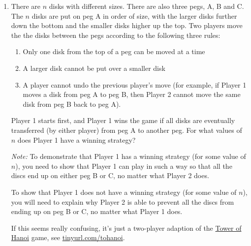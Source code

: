 \documentclass[a4paper,12pt]{article}
\begin{document}
\begin{enumerate}
    \item 
    There are $n$ disks with different sizes. There are also three pegs, A, B and C. The $n$ disks are put on peg A in order of size, with the larger disks further down the bottom and the smaller disks higher up the top. Two players move the the disks between the pegs according to the following three rules:
    \begin{enumerate}[label=(\roman*)]
        \item Only one disk from the top of a peg can be moved at a time
        \item A larger disk cannot be put over a smaller disk
        \item A player cannot undo the previous player's move (for example, if Player 1 moves a disk from peg A to peg B, then Player 2 cannot move the same disk from peg B back to peg A).
    \end{enumerate}
    Player 1 starts first, and Player 1 wins the game if all disks are eventually transferred (by either player) from peg A to another peg. For what values of $n$ does Player 1 have a winning strategy?
    
      \emph{Note:} To demonstrate that Player 1 has a winning strategy (for some value of $n$), you need to show that Player 1 can play in such a way so that all the discs end up on either peg B or C, no matter what Player 2 does.
      
      To show that Player 1 does not have a winning strategy (for some value of $n$), you will need to explain why Player 2 is able to prevent all the discs from ending up on peg B or C, no matter what Player 1 does.
        
    If this seems really confusing, it's just a two-player adaption of the \underline{Tower of Hanoi} game, see \url{tinyurl.com/tohanoi}.
    

\end{enumerate}
\end{document}
